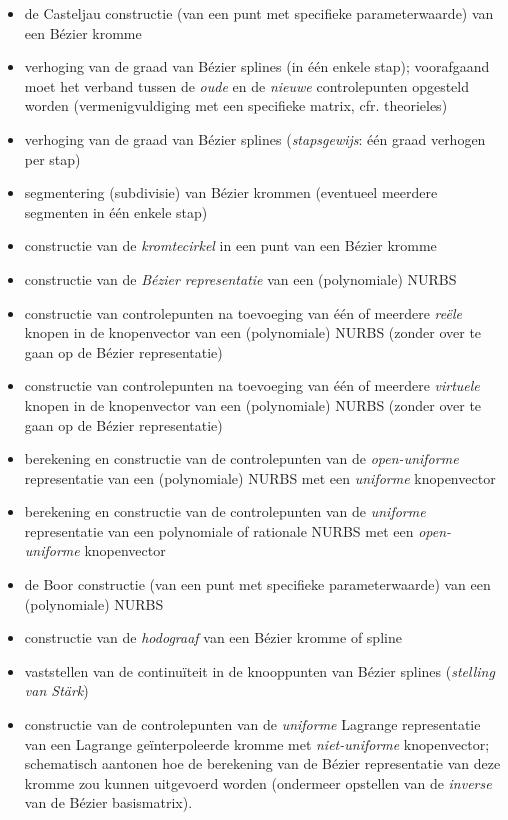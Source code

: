 \documentclass{report}
\begin{document}
	\begin{itemize}
		\item {} de Casteljau constructie (van een punt met specifieke parameterwaarde) van een Bézier kromme
		\item {} verhoging van de graad van Bézier splines (in één enkele stap); voorafgaand moet het verband tussen de \textit{oude} en de \textit{nieuwe} controlepunten opgesteld worden (vermenigvuldiging met een specifieke matrix, cfr. theorieles)
		\item {} verhoging van de graad van Bézier splines (\textit{stapsgewijs}: één graad verhogen per stap)
		\item {} segmentering (subdivisie) van Bézier krommen (eventueel meerdere segmenten in één enkele stap)
		\item {} constructie van de \textit{kromtecirkel} in een punt van een Bézier kromme
		\item {} constructie van de \textit{Bézier representatie} van een (polynomiale) NURBS
		\item {} constructie van controlepunten na toevoeging van één of meerdere \textit{reële} knopen in de knopenvector van een (polynomiale) NURBS (zonder over te gaan op de Bézier representatie)
		\item {} constructie van controlepunten na toevoeging van één of meerdere \textit{virtuele} knopen in de knopenvector van een (polynomiale) NURBS (zonder over te gaan op de Bézier representatie)
		\item {} berekening en constructie van de controlepunten van de \textit{open-uniforme} representatie van een (polynomiale) NURBS met een \textit{uniforme} knopenvector
		\item {} berekening en constructie van de controlepunten van de \textit{uniforme} representatie van een polynomiale of rationale NURBS met een \textit{open-uniforme} knopenvector
		\item {} de Boor constructie (van een punt met specifieke parameterwaarde) van een (polynomiale) NURBS
		\item {} constructie van de \textit{hodograaf} van een Bézier kromme of spline
		\item {} vaststellen van de continuïteit in de knooppunten van Bézier splines (\textit{stelling van Stärk})
		\item {} constructie van de controlepunten van de \textit{uniforme} Lagrange representatie van een Lagrange geïnterpoleerde kromme met \textit{niet-uniforme} knopenvector; schematisch aantonen hoe de berekening van de Bézier representatie van deze kromme zou kunnen uitgevoerd worden (ondermeer opstellen van de \textit{inverse} van de Bézier basismatrix).

\end{itemize}
\end{document}
